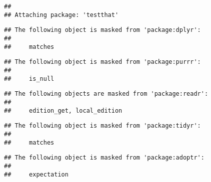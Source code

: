 \documentclass[
]{book}
\newenvironment{Shaded}{\begin{snugshade}}{\end{snugshade}}
\newcommand{\CharTok}[1]{\textcolor[rgb]{0.31,0.60,0.02}{#1}}
\newcommand{\CommentTok}[1]{\textcolor[rgb]{0.56,0.35,0.01}{\textit{#1}}}
\newcommand{\ControlFlowTok}[1]{\textcolor[rgb]{0.13,0.29,0.53}{\textbf{#1}}}
\newcommand{\DataTypeTok}[1]{\textcolor[rgb]{0.13,0.29,0.53}{#1}}
\newcommand{\DecValTok}[1]{\textcolor[rgb]{0.00,0.00,0.81}{#1}}
\newcommand{\FloatTok}[1]{\textcolor[rgb]{0.00,0.00,0.81}{#1}}
\newcommand{\KeywordTok}[1]{\textcolor[rgb]{0.13,0.29,0.53}{\textbf{#1}}}
\newcommand{\NormalTok}[1]{#1}
\newcommand{\StringTok}[1]{\textcolor[rgb]{0.31,0.60,0.02}{#1}}
\begin{document}
\begin{verbatim}
## 
## Attaching package: 'testthat'
\end{verbatim}

\begin{verbatim}
## The following object is masked from 'package:dplyr':
## 
##     matches
\end{verbatim}

\begin{verbatim}
## The following object is masked from 'package:purrr':
## 
##     is_null
\end{verbatim}

\begin{verbatim}
## The following objects are masked from 'package:readr':
## 
##     edition_get, local_edition
\end{verbatim}

\begin{verbatim}
## The following object is masked from 'package:tidyr':
## 
##     matches
\end{verbatim}

\begin{verbatim}
## The following object is masked from 'package:adoptr':
## 
##     expectation
\end{verbatim}

\begin{Shaded}
\end{Shaded}
\end{document}
